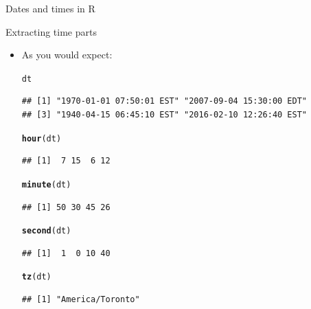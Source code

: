 \documentclass[unknownkeysallowed]{beamer}\usepackage[]{graphicx}\usepackage[]{color}
\makeatletter
\newcommand{\hlstd}[1]{\textcolor[rgb]{0.345,0.345,0.345}{#1}}%
\newcommand{\hlkwd}[1]{\textcolor[rgb]{0.737,0.353,0.396}{\textbf{#1}}}%
\newenvironment{kframe}{%
 \def\at@end@of@kframe{}%
 \ifinner\ifhmode%
  \def\at@end@of@kframe{\end{minipage}}%
  \begin{minipage}{\columnwidth}%
 \fi\fi%
 \def\FrameCommand##1{\hskip\@totalleftmargin \hskip-\fboxsep
 \colorbox{shadecolor}{##1}\hskip-\fboxsep
     \hskip-\linewidth \hskip-\@totalleftmargin \hskip\columnwidth}%
 \MakeFramed {\advance\hsize-\width
   \@totalleftmargin\z@ \linewidth\hsize
   \@setminipage}}%
 {\par\unskip\endMakeFramed%
 \at@end@of@kframe}
\newenvironment{knitrout}{}{} %
\makeatother
\begin{document}
\begin{frame}[fragile]{Dates and times in R}
\begin{itemize}
\begin{footnotesize}
  \end{footnotesize}
  \end{itemize}
  
\end{frame}

\begin{frame}[fragile]{Extracting time parts}
  
  \begin{itemize}
  \item As you would expect:
    \begin{small}
\begin{knitrout}
\color{fgcolor}\begin{kframe}
\begin{alltt}
\hlstd{dt}
\end{alltt}
\begin{verbatim}
## [1] "1970-01-01 07:50:01 EST" "2007-09-04 15:30:00 EDT"
## [3] "1940-04-15 06:45:10 EST" "2016-02-10 12:26:40 EST"
\end{verbatim}
\end{kframe}
\end{knitrout}

\begin{multicols}{2}
\begin{knitrout}
\color{fgcolor}\begin{kframe}
\begin{alltt}
\hlkwd{hour}\hlstd{(dt)}
\end{alltt}
\begin{verbatim}
## [1]  7 15  6 12
\end{verbatim}
\begin{alltt}
\hlkwd{minute}\hlstd{(dt)}
\end{alltt}
\begin{verbatim}
## [1] 50 30 45 26
\end{verbatim}
\end{kframe}
\end{knitrout}

\begin{knitrout}
\color{fgcolor}\begin{kframe}
\begin{alltt}
\hlkwd{second}\hlstd{(dt)}
\end{alltt}
\begin{verbatim}
## [1]  1  0 10 40
\end{verbatim}
\begin{alltt}
\hlkwd{tz}\hlstd{(dt)}
\end{alltt}
\begin{verbatim}
## [1] "America/Toronto"
\end{verbatim}
\end{kframe}
\end{knitrout}


\end{multicols}
\end{small}
\end{itemize}
\end{frame}
\end{document}
